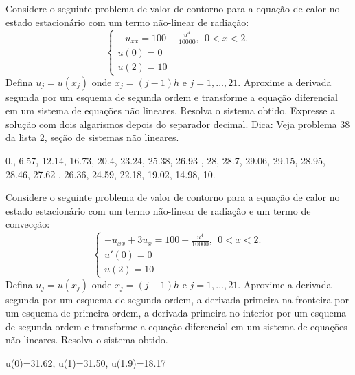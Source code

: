 \begin{Exercise} Considere o seguinte problema de valor de contorno para a equação de calor no estado estacionário com um termo não-linear de radiação:
$$\left\{\begin{array}{l}-u_{xx}=100- \frac{u^4}{10000},~~ 0<x<2.\\
u(0)=0\\
u(2)=10\end{array}
\right.
$$
Defina $u_j=u(x_j)$ onde $x_j={(j-1)}{h}$ e $j=1,\ldots,21$. Aproxime a derivada segunda por um esquema de segunda ordem e transforme a equação diferencial em um sistema de equações não lineares. Resolva o sistema  obtido. Expresse  a solução com dois algarismos depois do separador decimal. Dica: Veja problema 38 da lista 2, seção de sistemas não lineares.
\end{Exercise}

\begin{Answer}
  \begin{tiny}
0.,    6.57,    12.14,    16.73,    20.4,    23.24,    25.38,    26.93 ,   28,    28.7,    29.06,    29.15,    28.95,    28.46, 27.62 ,   26.36,    24.59,    22.18,    19.02,    14.98,    10.    
  \end{tiny}
\end{Answer}


\begin{Exercise} Considere o seguinte problema de valor de contorno para a equação de calor no estado estacionário com um termo não-linear de radiação e um termo de convecção:
$$\left\{\begin{array}{l}-u_{xx}+3u_x=100- \frac{u^4}{10000},~~ 0<x<2.\\
u'(0)=0\\
u(2)=10\end{array}
\right.
$$
Defina $u_j=u(x_j)$ onde $x_j={(j-1)}{h}$ e $j=1,\ldots,21$. Aproxime a derivada segunda por um esquema de segunda ordem, a derivada primeira na fronteira por um esquema de primeira ordem, a derivada primeira no interior por um esquema de segunda ordem e transforme a equação diferencial em um sistema de equações não lineares. Resolva o sistema  obtido.
\end{Exercise}
\begin{Answer}
  \begin{tiny}
u(0)=31.62, u(1)=31.50, u(1.9)=18.17    
  \end{tiny}
\end{Answer}


